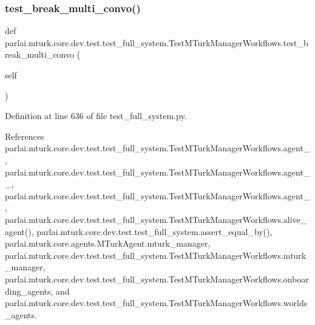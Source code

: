 \subsubsection{\texorpdfstring{test\+\_\+break\+\_\+multi\+\_\+convo()}{test\_break\_multi\_convo()}}
{\footnotesize\ttfamily def parlai.\+mturk.\+core.\+dev.\+test.\+test\+\_\+full\+\_\+system.\+Test\+M\+Turk\+Manager\+Workflows.\+test\+\_\+break\+\_\+multi\+\_\+convo (\begin{DoxyParamCaption}\item[{}]{self }\end{DoxyParamCaption})}



Definition at line 636 of file test\+\_\+full\+\_\+system.\+py.



References parlai.\+mturk.\+core.\+dev.\+test.\+test\+\_\+full\+\_\+system.\+Test\+M\+Turk\+Manager\+Workflows.\+agent\+\_, parlai.\+mturk.\+core.\+dev.\+test.\+test\+\_\+full\+\_\+system.\+Test\+M\+Turk\+Manager\+Workflows.\+agent\+\_\+\_, parlai.\+mturk.\+core.\+dev.\+test.\+test\+\_\+full\+\_\+system.\+Test\+M\+Turk\+Manager\+Workflows.\+agent\+\_, parlai.\+mturk.\+core.\+dev.\+test.\+test\+\_\+full\+\_\+system.\+Test\+M\+Turk\+Manager\+Workflows.\+alive\+\_\+agent(), parlai.\+mturk.\+core.\+dev.\+test.\+test\+\_\+full\+\_\+system.\+assert\+\_\+equal\+\_\+by(), parlai.\+mturk.\+core.\+agents.\+M\+Turk\+Agent.\+mturk\+\_\+manager, parlai.\+mturk.\+core.\+dev.\+test.\+test\+\_\+full\+\_\+system.\+Test\+M\+Turk\+Manager\+Workflows.\+mturk\+\_\+manager, parlai.\+mturk.\+core.\+dev.\+test.\+test\+\_\+full\+\_\+system.\+Test\+M\+Turk\+Manager\+Workflows.\+onboarding\+\_\+agents, and parlai.\+mturk.\+core.\+dev.\+test.\+test\+\_\+full\+\_\+system.\+Test\+M\+Turk\+Manager\+Workflows.\+worlds\+\_\+agents.

